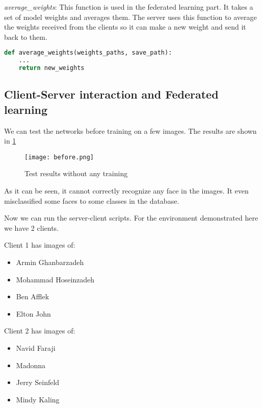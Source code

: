 \textit{average\_weights}: This function is used in the federated learning part. It takes a set of model weights and averages them. The server uses this function to average the weights received from the clients so it can make a new weight and send it back to them.

\begin{center}{\begin{minipage}{0.9\linewidth}
\begin{lstlisting}[language=Python, basicstyle=\fontsize{10}{10}\selectfont\ttfamily]
def average_weights(weights_paths, save_path):
    ...
    return new_weights
\end{lstlisting}
\end{minipage}}\end{center}

\subsection*{Client-Server interaction and Federated learning}

We can test the networks before training on a few images. The results are shown in \ref{f10}

\begin{figure}[H]
	\centering
	\texttt{[image: before.png]}
	\caption{Test results without any training}
	\label{f10}
\end{figure}

As it can be seen, it cannot correctly recognize any face in the images. It even misclassified some faces to some classes in the database. 

Now we can run the server-client scripts. For the environment demonstrated here we have 2 clients. 

Client 1 has images of:
\begin{itemize}
	\setlength\itemsep{0.01em}
	\item Armin Ghanbarzadeh
	\item Mohammad Hoseinzadeh
	\item Ben Afflek
	\item Elton John
\end{itemize}

Client 2 has images of:
\begin{itemize}
	\setlength\itemsep{0.01em}
	\item Navid Faraji
	\item Madonna
	\item Jerry Seinfeld
	\item Mindy Kaling
\end{itemize}

